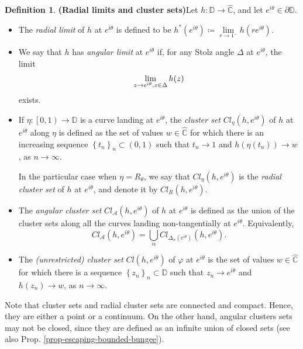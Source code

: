 \documentclass[11pt,a4paper,reqno]{amsart}
\theoremstyle{plain}
\theoremstyle{definition}
\newtheorem{defi}[thm]{Definition}
\theoremstyle{plain}
\begin{document}
\begin{defi}{\bf (Radial limits and cluster sets)}\label{defi-radial-lim}
	Let $ h\colon \mathbb{D}\to\widehat{\mathbb{C}}$, and let $ e^{i\theta}\in\partial \mathbb{D} $.
	\begin{itemize}
		\item The {\em radial limit} of $ h $ at $ e^{i\theta} $ is defined to be $h^* (e^{i\theta} )\coloneqq\lim\limits_{r\to 1^-} h(re^{i\theta})$.

		\item	We say that  $ h $  has \textit{angular limit} at $ e^{i\theta}  $ if, for any Stolz angle $ \Delta $ at $ e^{i\theta} $, the limit \[\lim\limits_{z\to e^{i\theta} ,\\ z\in\Delta}h(z) \]  exists.
			\item If $ \eta\colon \left[ 0,1\right) \to\mathbb{D} $ is a curve  landing at $ e^{i\theta} $, the {\em cluster set} $ Cl_\eta(h, e^{i\theta}) $ of $ h $ at $ e^{i\theta} $ along $ \eta $ is defined as the set of values $ w\in\widehat{\mathbb{C}}$ for which there is an increasing sequence $ \left\lbrace t_n\right\rbrace _n \subset (0,1) $ such that $ t_n\to 1 $ and $h(\eta(t_n))\to w $, as $ n\to\infty $.



		\noindent In the particular case when $ \eta=R_\theta $, we say that $ Cl_\eta(h, e^{i\theta}) $ is  the {\em radial cluster set} of $ h $ at $ e^{i\theta} $, and denote it by $ Cl_R(h, e^{i\theta}) $.
		\item The {\em angular cluster set} $ Cl_\mathcal{A}(h, e^{i\theta}) $ of $ h $ at $ e^{i\theta} $ is defined as the union of the cluster sets along all the curves landing non-tangentially at $ e^{i\theta} $. Equivalently,
		\[Cl_\mathcal{A}(h, e^{i\theta})
		= \bigcup_{\alpha %
		} Cl_{\Delta_\alpha(e^{i\theta})}(h, e^{i\theta}).\]
		\item The {\em (unrestricted) cluster set} $ Cl(h, e^{i\theta}) $ of $ \varphi $ at $ e^{i\theta} $ is the set of values $ w\in\widehat{\mathbb{C}} $ for which there is a sequence $ \left\lbrace z_n\right\rbrace _n \subset\mathbb{D}$ such that $ z_n\to e^{i\theta} $ and $h (z_n)\to w $, as $ n\to\infty $.
	\end{itemize}
\end{defi}

Note that cluster sets and radial cluster sets are connected and compact. Hence, they are either a point or a continuum. On the other hand, angular clusters sets may not be closed, since they are defined as an infinite union of closed sets (see also Prop. \ref{prop-escaping-bounded-bungee}).
\end{document}
